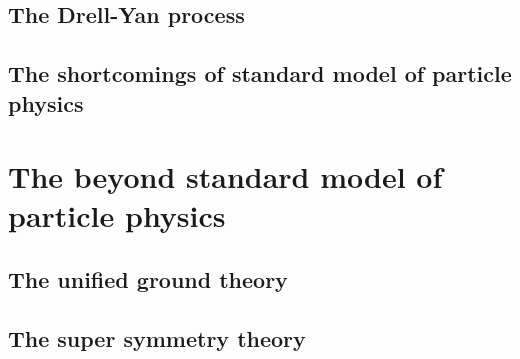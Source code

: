 \section{The Drell-Yan process}\label{subsec:DY}
\section{The shortcomings of standard model of particle physics}\label{subsec:shortcoming}
\chapter{The beyond standard model of particle physics}\label{sec:BSM}
\section{The unified ground theory}\label{subsec:GUT}
\section{The super symmetry theory}\label{subsec:SUSY}
